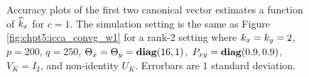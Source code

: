 \begin{figure}
  \begin{center}
    \caption{Accuracy plots of the first two canonical vector estimates a function of
      $\widehat{k}_x$ for $c=1$. The simulation setting is the same as Figure
      \ref{fig:chpt5:icca_convg_w1} for a rank-2 setting where $k_x=k_y=2$, $p=200$,
      $q=250$, $\Theta_x=\Theta_y=\mathop{\bf diag}(16,1)$, $P_{xy}=\mathop{\bf diag}(0.9,0.9)$, $V_K=I_2$, and non-identity
      $U_K$. Errorbars are 1 standard deviation.}
    \label{fig:chpt5:khat_c2}
  \end{center}
\end{figure}

